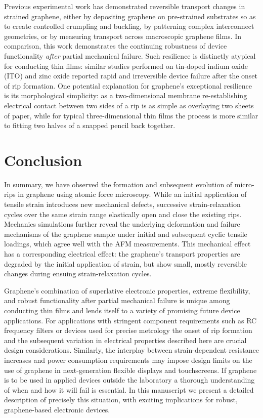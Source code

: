\documentclass[%
 aps,
 pra,
 longbibliography,
 amsmath,amssymb,
 reprint,
 superscriptaddress,
]{revtex4-1}
\begin{document}
Previous experimental work has demonstrated reversible transport changes in
strained graphene, either by depositing graphene on pre-strained substrates so
as to create controlled crumpling\cite{Zang2013} and buckling\cite{Wang2011},
by patterning complex interconnect geometries\cite{Kim2011,Lee2010}, or by
measuring transport across macroscopic graphene films\cite{Kim2009,Bae2010}. In
comparison, this work demonstrates the continuing robustness of device
functionality \textit{after} partial mechanical failure. Such resilience is
distinctly atypical for conducting thin films: similar studies performed on
tin-doped indium oxide (ITO)\cite{Cairns2000} and zinc
oxide\cite{Fortunato2002} reported rapid and irreversible device failure after
the onset of rip formation.  One potential explanation for graphene's
exceptional resilience is its morphological simplicity: as a two-dimensional
membrane re-establishing electrical contact between two sides of a rip is as
simple as overlaying two sheets of paper, while for typical three-dimensional
thin films the process is more similar to fitting two halves of a snapped
pencil back together.

\section{Conclusion}

In summary, we have observed the formation and subsequent evolution of
micro-rips in graphene using atomic force microscopy. While an initial
application of tensile strain introduces new mechanical defects, successive
strain-relaxation cycles over the same strain range elastically open and close
the existing rips. Mechanics simulations further reveal the underlying
deformation and failure mechanisms of the graphene sample under initial and
subsequent cyclic tensile loadings, which agree well with the AFM measurements.
This mechanical effect has a corresponding electrical effect: the graphene's
transport properties are degraded by the initial application of strain, but
show small, mostly reversible changes during ensuing strain-relaxation cycles.

Graphene's combination of superlative electronic properties, extreme
flexibility, and robust functionality after partial mechanical failure is
unique among conducting thin films and lends itself to a variety of promising
future device applications. For applications with stringent component
requirements such as RC frequency filters or devices used for precise metrology
the onset of rip formation and the subsequent variation in electrical
properties described here are crucial design considerations. Similarly, the
interplay between strain-dependent resistance increases and power consumption
requirements may impose design limits on the use of graphene in next-generation
flexible displays and touchscreens. If graphene is to be used in applied
devices outside the laboratory a thorough understanding of when and how it will
fail is essential. In this manuscript we present a detailed description of
precisely this situation, with exciting implications for robust, graphene-based
electronic devices.
\end{document}
